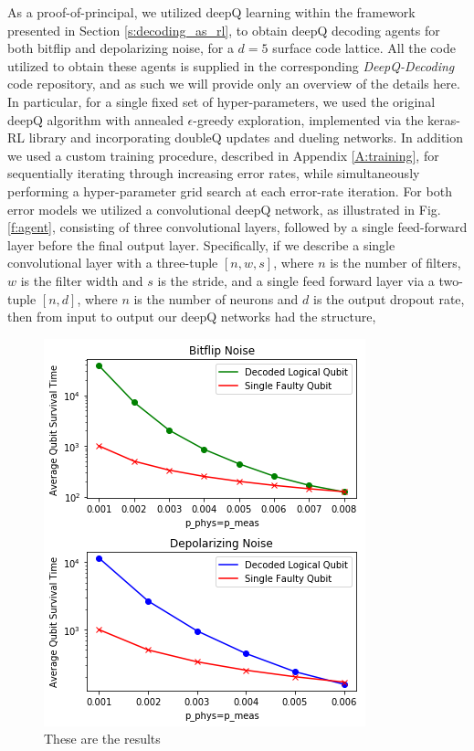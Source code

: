 \documentclass[twocolumn,preprintnumbers,amsmath,amssymb,notitlepage,nofootinbib,longbibliography,superscriptaddress,aps,pra,10pt]{revtex4-1}
\begin{document}
    As a proof-of-principal, we utilized deepQ learning within the framework presented in Section \ref{s:decoding_as_rl}, to obtain deepQ decoding agents for both bitflip and depolarizing noise, for a $d=5$ surface code lattice. 
    All the code utilized to obtain these agents is supplied in the corresponding \textit{DeepQ-Decoding} code repository, and as such we will provide only an overview of the details here.
    In particular, for a single fixed set of hyper-parameters, we used the original deepQ algorithm with annealed $\epsilon$-greedy exploration, implemented via the keras-RL library and incorporating doubleQ updates and dueling networks.
    In addition we used a custom training procedure, described in Appendix \ref{A:training}, for sequentially iterating through increasing error rates, while simultaneously performing a hyper-parameter grid search at each error-rate iteration.
    For both error models we utilized a convolutional deepQ network, as illustrated in Fig. \ref{f:agent}, consisting of three convolutional layers, followed by a single feed-forward layer before the final output layer.
    Specifically, if we describe a single convolutional layer with a three-tuple $[n,w,s]$, where $n$ is the number of filters, $w$ is the filter width and $s$ is the stride, and a single feed forward layer via a two-tuple $[n,d]$, where $n$ is the number of neurons and $d$ is the output dropout rate, then from input to output our deepQ networks had the structure,

        \begin{figure}
        \centering
        \includegraphics[width=0.8\linewidth]{figures/results.png}
        \caption{These are the results}\label{f:results}
    \end{figure}
\end{document}
